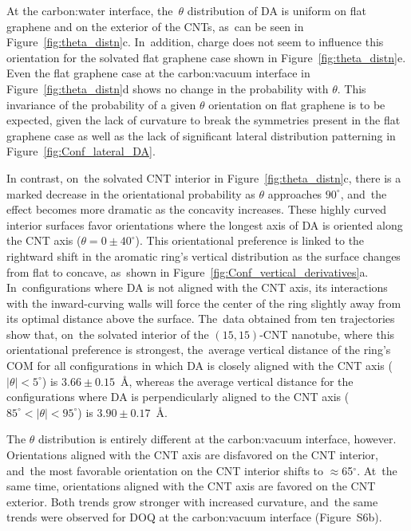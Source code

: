 \documentclass[molecules,article,accept,pdftex,moreauthors]{Definitions/mdpi}
\begin{document}
At the carbon:water interface, the~$\theta$ distribution of DA is uniform on flat graphene and on the exterior of the CNTs, as~can be seen in Figure~\ref{fig:theta_distn}c. In~addition, charge does not seem to influence this orientation for the solvated flat graphene case shown in Figure~\ref{fig:theta_distn}e. Even the flat graphene case at the carbon:vacuum interface in Figure~\ref{fig:theta_distn}d shows no change in the probability with $\theta$. This invariance of the probability of a given $\theta$ orientation on flat graphene is to be expected, given the lack of curvature to break the symmetries present in the flat graphene case as well as the lack of significant lateral distribution patterning in Figure~\ref{fig:Conf_lateral_DA}.
    
In contrast, on~the solvated CNT interior in Figure~\ref{fig:theta_distn}c, there is a marked decrease in the orientational probability as $\theta$ approaches $90^{\circ}$, and~the effect becomes more dramatic as the concavity increases. These highly curved interior surfaces favor orientations where the longest axis of DA is oriented along the CNT axis ($\theta=0\pm40^{\circ}$). This orientational preference is linked to the rightward shift in the aromatic ring's vertical distribution as the surface changes from flat to concave, as~shown in Figure~\ref{fig:Conf_vertical_derivatives}a. In~configurations where DA is not aligned with the CNT axis, its interactions with the inward-curving walls will force the center of the ring slightly away from its optimal distance above the surface. The~data obtained from ten trajectories show that, on~the solvated interior of the $(15,15)$-CNT nanotube, where this orientational preference is strongest, the~average vertical distance of the ring's COM for all configurations in which DA is closely aligned with the CNT axis ($|\theta|<5^{\circ}$) is $3.66\pm0.15$~\AA, whereas the average vertical distance for the configurations where DA is perpendicularly aligned to the CNT axis ($85^{\circ}<|\theta|<95^{\circ}$) is $3.90\pm0.17$~\AA.

The $\theta$ distribution is entirely different at the carbon:vacuum interface, however. Orientations aligned with the CNT axis are disfavored on the CNT interior, and~the most favorable orientation on the CNT interior shifts to $\approx$65$^{\circ}$. At~the same time, orientations aligned with the CNT axis are favored on the CNT exterior. Both trends grow stronger with increased curvature, and~the same trends were observed for DOQ at the carbon:vacuum interface (Figure~S6b).
\end{document}
